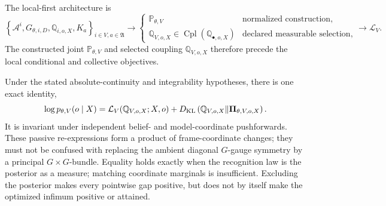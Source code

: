 The local-first architecture is
\begin{equation}
\left\{
\mathcal A^i,G_{\theta,i,D},\mathbb Q_{i,o,X},K_a
\right\}_{i\in V,a\in\mathfrak A}
\longrightarrow
\begin{cases}
\mathbb P_{\theta,V} & \text{normalized construction},\\
\mathbb Q_{V,o,X}\in\operatorname{Cpl}(\mathbb Q_{\bullet,o,X})
& \text{declared measurable selection},
\end{cases}
\longrightarrow
\mathcal L_V.
\label{eq:intro-local-to-global-architecture}
\end{equation}
The constructed joint \(\mathbb P_{\theta,V}\) and selected coupling
\(\mathbb Q_{V,o,X}\) therefore precede the local conditional and collective objectives.

Under the stated absolute-continuity and integrability hypotheses, there is one exact identity,
\begin{equation}
\log p_{\theta,V}(o\mid X)
=\mathcal L_V(\mathbb Q_{V,o,X};X,o)
+D_{\mathrm{KL}}\left(\mathbb Q_{V,o,X}\middle\Vert
\boldsymbol\Pi_{\theta,V,o,X}\right).
\label{eq:elbo-intro-identity}
\end{equation}
It is invariant under independent belief- and model-coordinate pushforwards.
These passive re-expressions form a product of frame-coordinate changes; they
must not be confused with replacing the ambient diagonal \(G\)-gauge symmetry
by a principal \(G\times G\)-bundle.  Equality
holds exactly when the recognition law is the posterior as a measure; matching
coordinate marginals is insufficient.  Excluding the posterior makes every
pointwise gap positive, but does not by itself make the optimized infimum
positive or attained. 


